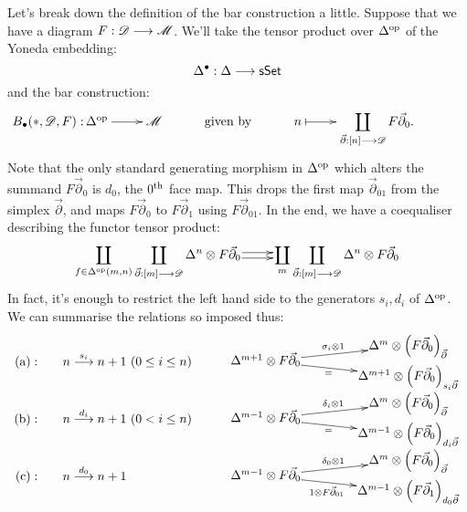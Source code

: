 \documentclass[11pt]{article}
\begin{document}
Let's break down the definition of the bar construction a little. Suppose that we have a diagram $F:\mathscr{D}\longrightarrow\mathscr{M}$. We'll take the tensor product over $\Delta^{\textup{op}}$ of the Yoneda embedding:
\[\Delta^\bullet :\Delta\longrightarrow\operatorname{{\mathsf{sSet}}}
\]
and the bar construction:
\[\qquad \vcenter{\xymatrix@R=0mm{
\makebox[0cm][r]{ $B_\bullet (*,\scrd,F):$\,}\ar[r]%
\Delta^{\op}&%
\scrm&\textup{ given by }&%
n%
\ar@{|->}[r]&
\displaystyle \coprod_{\vec\partial :[n]\to\scrd}F\vec\partial_0.%
}}
\]
Note that the only standard generating morphism in $\Delta^{\textup{op}}$ which alters the summand $F\vec\partial_0$ is $d_0$, the $0^\textup{th}$ face map. This drops the first map $\vec\partial_{01}$ from the simplex $\vec\partial$, and maps $F\vec\partial_0$ to $F\vec\partial_1$ using $F\vec\partial_{01}$. In the end, we have a coequaliser describing the functor tensor product:
\[
\vcenter{\xymatrix@1{
\displaystyle\coprod_{f\in\Delta^{\op}(m,n)}\displaystyle \coprod_{\vec\partial:[m]\to\scrd}\Delta^n\otimes F\vec\partial_0
\ar@<+.5ex>[r]
\ar@<-.5ex>[r]
&%
\displaystyle\coprod_{m} \displaystyle\coprod_{\vec\partial :[m]\to\scrd}\Delta^n\otimes F\vec\partial_0%
}}\]
In fact, it's enough to restrict the left hand side to the generators $s_i,d_i$ of $\Delta^{\textup{op}}$. We can summarise the relations so imposed thus:
\[\begin{array}{rll}
\textup{(a)}:\quad &
n\overset{s_i}{\to}n+1\ (0\leq i\leq n)\quad &
\vcenter{\xymatrix@R=.43cm@C=4cm@!0@1{
&%
\Delta^m\otimes \left(F\vec\partial_0\right)_{\vec\partial}
\\%
\Delta^{m+1}\otimes F\vec\partial_0
\ar[ur]^-{\sigma_i\otimes 1}
\ar[dr]_-{=}
&%
\\%
&%
\Delta^{m+1}\otimes \left(F\vec\partial_0\right) _{s_i\vec\partial}%
}}\\
\textup{(b)}:\quad &
n\overset{d_i}{\to}n+1\ (0<i\leq n)\qquad &
\vcenter{\xymatrix@R=.43cm@C=4cm@!0@1{
&%
\Delta^m\otimes \left(F\vec\partial_0\right)_{\vec\partial}
\\%
\Delta^{m-1}\otimes F\vec\partial_0
\ar[ur]^-{\delta_i\otimes 1}
\ar[dr]_-{=}
&%
\\%
&%
\Delta^{m-1}\otimes \left(F\vec\partial_0\right) _{d_i\vec\partial}%
}}\\
\textup{(c)}:\quad &
n\overset{d_0}{\to}n+1\qquad &
\vcenter{\xymatrix@R=.43cm@C=4cm@!0@1{
&%
\Delta^m\otimes \left(F\vec\partial_0\right)_{\vec\partial}
\\%
\Delta^{m-1}\otimes F\vec\partial_0
\ar[ur]^-{\delta_0\otimes 1}
\ar[dr]_-{1\otimes F\vec\partial_{01}}
&%
\\%
&%
\Delta^{m-1}\otimes \left(F\vec\partial_1\right) _{d_0\vec\partial}%
}}
\end{array}\]
\end{document}
